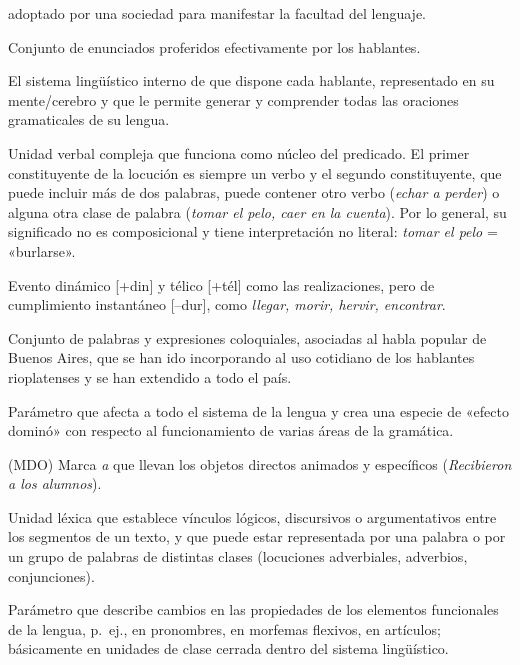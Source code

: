 \begin{glosariogeneral}
        adoptado por una sociedad para manifestar la facultad del lenguaje.
  \item[Lengua-E:] Conjunto de enunciados proferidos efectivamente por los
        hablantes.
  \item[Lengua-I:] El sistema lingüístico interno de que dispone cada hablante,
        representado en su mente/cerebro y que le permite generar y comprender
        todas las oraciones gramaticales de su lengua.
  \item[Locución verbal:] Unidad verbal compleja que funciona como núcleo del
        predicado. El primer constituyente de la locución es siempre un verbo y
        el segundo constituyente, que puede incluir más de dos palabras, puede
        contener otro verbo (\textit{echar a perder}) o alguna otra clase de
        palabra (\textit{tomar el pelo, caer en la cuenta}). Por lo general, su
        significado no es composicional y tiene interpretación no literal:
        \textit{tomar el pelo} = «burlarse».
  \item[Logro:] Evento dinámico [+din] y télico [+tél] como las realizaciones,
        pero de cumplimiento instantáneo [--dur], como \textit{llegar, morir,
        hervir, encontrar}.
  \item[Lunfardo:] Conjunto de palabras y expresiones coloquiales, asociadas al
        habla popular de Buenos Aires, que se han ido incorporando al uso
        cotidiano de los hablantes rioplatenses y se han extendido a todo el
        país.
  \item[Macroparámetro:] Parámetro que afecta a todo el sistema de la lengua y
        crea una especie de «efecto dominó» con respecto al funcionamiento de
        varias áreas de la gramática.
  \item[Marcado diferencial de objeto:] (MDO) Marca \textit{a} que llevan
        los objetos directos animados y específicos (\textit{Recibieron a los
        alumnos}).
  \item[Marcador discursivo:] Unidad léxica que establece vínculos lógicos,
        discursivos o argumentativos entre los segmentos de un texto, y que
        puede estar representada por una palabra o por un grupo de palabras de
        distintas clases (locuciones adverbiales, adverbios, conjunciones).
  \item[Microparámetro:] Parámetro que describe cambios en las propiedades de
        los elementos funcionales de la lengua, p.~ej., en pronombres, en
        morfemas flexivos, en artículos; básicamente en unidades de clase
        cerrada dentro del sistema lingüístico.

\end{glosariogeneral}

